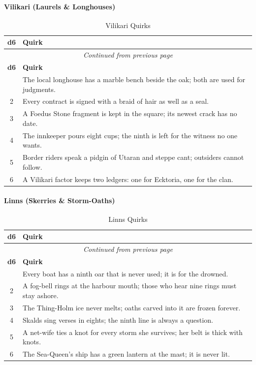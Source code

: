 \paragraph{Vilikari (Laurels \& Longhouses)}
\begin{center}
\begin{longtable}{cl}
\caption{Vilikari Quirks}\\
\toprule
\textbf{d6} & \textbf{Quirk} \\
\midrule
\endfirsthead
\multicolumn{2}{c}{\emph{Continued from previous page}} \\
\toprule
\textbf{d6} & \textbf{Quirk} \\
\midrule
\endhead
\bottomrule
\endfoot
1 & The local longhouse has a marble bench beside the oak; both are used for judgments. \\
2 & Every contract is signed with a braid of hair as well as a seal. \\
3 & A Foedus Stone fragment is kept in the square; its newest crack has no date. \\
4 & The innkeeper pours eight cups; the ninth is left for the witness no one wants. \\
5 & Border riders speak a pidgin of Utaran and steppe cant; outsiders cannot follow. \\
6 & A Vilikari factor keeps two ledgers: one for Ecktoria, one for the clan. \\
\end{longtable}
\end{center}

\paragraph{Linns (Skerries \& Storm-Oaths)}
\begin{center}
\begin{longtable}{cl}
\caption{Linns Quirks}\\
\toprule
\textbf{d6} & \textbf{Quirk} \\
\midrule
\endfirsthead
\multicolumn{2}{c}{\emph{Continued from previous page}} \\
\toprule
\textbf{d6} & \textbf{Quirk} \\
\midrule
\endhead
\bottomrule
\endfoot
1 & Every boat has a ninth oar that is never used; it is for the drowned. \\
2 & A fog-bell rings at the harbour mouth; those who hear nine rings must stay ashore. \\
3 & The Thing-Holm ice never melts; oaths carved into it are frozen forever. \\
4 & Skalds sing verses in eights; the ninth line is always a question. \\
5 & A net-wife ties a knot for every storm she survives; her belt is thick with knots. \\
6 & The Sea-Queen's ship has a green lantern at the mast; it is never lit. \\
\end{longtable}
\end{center}

